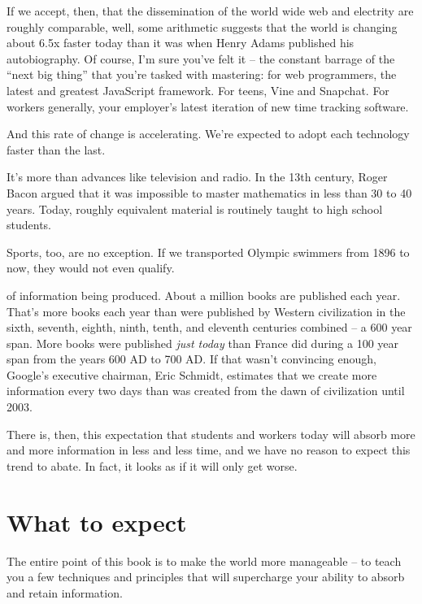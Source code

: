 If we accept, then, that the dissemination of the world wide web and electrity are
roughly comparable, well, some arithmetic suggests that the world is
changing about 6.5x faster today than it was when Henry Adams published his
autobiography. Of course, I'm sure you've felt it -- the constant barrage of the
``next big thing'' that you're tasked with mastering: for web programmers, the
latest and greatest JavaScript framework. For teens, Vine and Snapchat. For
workers generally, your employer's latest iteration of new time tracking
software. 

And this rate of change is accelerating. We're expected to adopt each technology faster than the last.

 It's more than
advances like television and radio. In the 13th century, Roger Bacon argued that
it was impossible to master mathematics in less than 30 to 40 years. Today,
roughly equivalent material is routinely taught to high school students.

Sports, too, are no exception. If we transported Olympic swimmers from 1896 to now, they would not even qualify. \cite{ericsson2006influence}

 of information being produced. About a million books are published each year. That's more books each year than were published
by Western civilization in the sixth, seventh, eighth, ninth, tenth, and
eleventh centuries combined -- a 600 year span. More books were published \textit{just
today} than France did during a 100 year span from the years 600 AD to 700
AD.\cite{buringh2009charting} If that wasn't convincing enough, Google's
executive chairman, Eric Schmidt, estimates that we create more information
every two days than was created from the dawn of civilization until 2003.

There is, then, this expectation that students and workers today will absorb
more and more information in less and less time, and we have no reason to expect
this trend to abate. In fact, it looks as if it will only get worse.

\section{What to expect}

 The entire point of this book is to make the world more manageable -- to teach you a few techniques and principles that will supercharge your ability to absorb and retain information. 

